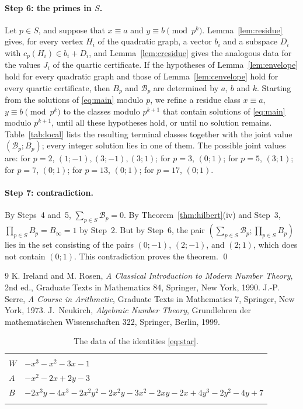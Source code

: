 \documentclass[11pt]{article}
\begin{document}
\paragraph{Step 6: the primes in $S$.} Let $p\in S$, and suppose that $x\equiv a$ and $y\equiv b\pmod{p^k}$. Lemma~\ref{lem:residue} gives, for every vertex $H_i$ of the quadratic graph, a vector $b_i$ and a subspace $D_i$ with $c_p(H_i)\in b_i+D_i$, and Lemma~\ref{lem:cresidue} gives the analogous data for the values $J_i$ of the quartic certificate. If the hypotheses of Lemma~\ref{lem:envelope} hold for every quadratic graph and those of Lemma~\ref{lem:cenvelope} hold for every quartic certificate, then $B_p$ and $\mathcal B_p$ are determined by $a$, $b$ and $k$. Starting from the solutions of \eqref{eq:main} modulo $p$, we refine a residue class $x\equiv a$, $y\equiv b\pmod{p^k}$ to the classes modulo $p^{k+1}$ that contain solutions of \eqref{eq:main} modulo $p^{k+1}$, until all these hypotheses hold, or until no solution remains. Table~\ref{tab:local} lists the resulting terminal classes together with the joint value $(\mathcal B_p;B_p)$; every integer solution lies in one of them. The possible joint values are: for $p=2$, $(1;-1),\allowbreak (3;-1),\allowbreak (3;1)$; for $p=3$, $(0;1)$; for $p=5$, $(3;1)$; for $p=7$, $(0;1)$; for $p=13$, $(0;1)$; for $p=17$, $(0;1)$.

\paragraph{Step 7: contradiction.} By Steps~4 and~5, $\sum_{p\in S}\mathcal B_p=0$. By Theorem~\ref{thm:hilbert}(iv) and Step~3, $\prod_{p\in S}B_p=B_\infty=1$ by Step~2. But by Step~6, the pair $(\textstyle\sum_{p\in S}\mathcal B_p;\prod_{p\in S}B_p)$ lies in the set consisting of the pairs $(0;-1)$, $(2;-1)$, and $(2;1)$, which does not contain $(0;1)$. This contradiction proves the theorem.
\qed

\begin{thebibliography}{9}
 K. Ireland and M. Rosen, \emph{A Classical Introduction to Modern Number Theory}, 2nd ed., Graduate Texts in Mathematics 84, Springer, New York, 1990.
 J.-P. Serre, \emph{A Course in Arithmetic}, Graduate Texts in Mathematics 7, Springer, New York, 1973.
 J.~Neukirch, \emph{Algebraic Number Theory}, Grundlehren der mathematischen Wissenschaften 322, Springer, Berlin, 1999.
\end{thebibliography}

\clearpage
\begingroup\footnotesize
\setlength{\LTcapwidth}{\textwidth}
\begin{longtable}{@{}ll@{}}
\caption{The data of the identities \eqref{eq:star}.}\label{tab:star}\\
\hline\endfirsthead\hline\endhead\hline\endfoot
\multicolumn{2}{@{}l}{$i=0$, $m=2$, neighbours $1$}\\
$W$ & $-x^{3}-x^{2}-3x-1$\\
$A$ & $-x^{2}-2x+2y-3$\\
$B$ & $-2x^{3}y-4x^{3}-2x^{2}y^{2}-2x^{2}y-3x^{2}-2xy-2x+4y^{3}-2y^{2}-4y+7$\\
\addlinespace[3pt]
\end{longtable}
\endgroup
\end{document}
